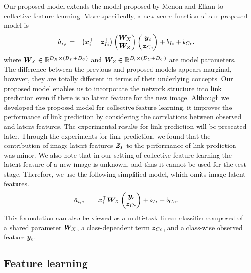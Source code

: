\documentclass[letterpaper]{article} %
\begin{document}
Our proposed model extends the model proposed by Menon and Elkan to collective feature learning.
More specifically, a new score function of our proposed model is
\begin{eqnarray}
  \hat{a}_{i,c}
  &=& \begin{pmatrix}\bm{x}_i^{\top} & \bm{z}_{Ii}^{\top}\end{pmatrix}
      \begin{pmatrix}\bm{W}_X \\ \bm{W}_Z\end{pmatrix}
      \begin{pmatrix}\bm{y}_c \\ \bm{z}_{Cc}\end{pmatrix} + b_{Ii} + b_{Cc},
\end{eqnarray}
where $\bm{W}_X\in\mathbb R^{D_X\times(D_Y+D_C)}$ and $\bm{W}_Z\in\mathbb R^{D_I\times(D_Y+D_C)}$ are model parameters.
The difference between the previous and proposed models appears marginal, however, they are totally different in terms of their underlying concepts.
Our proposed model enables us to incorporate the network structure into link prediction even if there is no latent feature for the new image.
Although we developed the proposed model for collective feature learning, it improves the performance of link prediction by considering the correlations between observed and latent features.
The experimental results for link prediction will be presented later.
Through the experiments for link prediction, we found that the contribution of image latent features $\bm{Z}_I$ to the performance of link prediction was minor.
We also note that in our setting of collective feature learning the latent feature of a new image is unknown, and thus it cannot be used for the test stage.
Therefore, we use the following simplified model, which omits image latent features.
\begin{eqnarray}
  \hat{a}_{i,c}
  &=& \bm{x}_i^{\top} \bm{W}_X \begin{pmatrix}\bm{y}_c \\ \bm{z}_{Cc}\end{pmatrix} + b_{Ii} + b_{Cc}.
  \label{eq:linkscore:new}
\end{eqnarray}
This formulation can also be viewed as a multi-task linear classifier composed of a shared parameter $\bm{W}_X$, a class-dependent term $\bm{z}_{Cc}$, and a class-wise observed feature $\bm{y}_c$.

\subsection{Feature learning}
\label{sec:proposed:learning}
\indent
\end{document}
